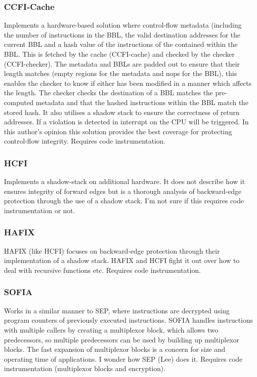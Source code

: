 \subsubsection{CCFI-Cache}
Implements a hardware-based solution where control-flow metadata (including the number of instructions in the BBL, the valid destination addresses for the current BBL and a hash value of the instructions of the contained within the BBL. This is fetched by the cache (CCFI-cache) and checked by the checker (CCFI-checker). The metadata and BBLs are padded out to ensure that their length matches (empty regions for the metadata and nops for the BBL), this enables the checker to know if either has been modified in a manner which affects the length. The checker checks the destination of a BBL matches the pre-computed metadata and that the hashed instructions within the BBL match the stored hash. It also utilises a shadow stack to ensure the correctness of return addresses. If a violation is detected in interrupt on the CPU will be triggered. In this author's opinion this solution provides the best coverage for protecting control-flow integrity. Requires code instrumentation.

\subsubsection{HCFI}
Implements a shadow-stack on additional hardware. It does not describe how it ensures integrity of forward edges but is a thorough analysis of backward-edge protection through the use of a shadow stack. I'm not sure if this requires code instrumentation or not.

\subsubsection{HAFIX}
HAFIX (like HCFI) focuses on backward-edge protection through their implementation of a shadow stack. HAFIX and HCFI fight it out over how to deal with recursive functions etc. Requires code instrumentation.

\subsubsection{SOFIA}
Works in a similar manner to SEP, where instructions are decrypted using program counters of previously executed instructions. SOFIA handles instructions with multiple callers by creating a multiplexor block, which allows two predecessors, so multiple predecessors can  be used by building up multiplexor blocks. The fast expansion of multiplexor blocks is a concern for size and operating time of applications. I wonder how SEP (Lee) does it. Requires code instrumentation (multiplexor blocks and encryption).

